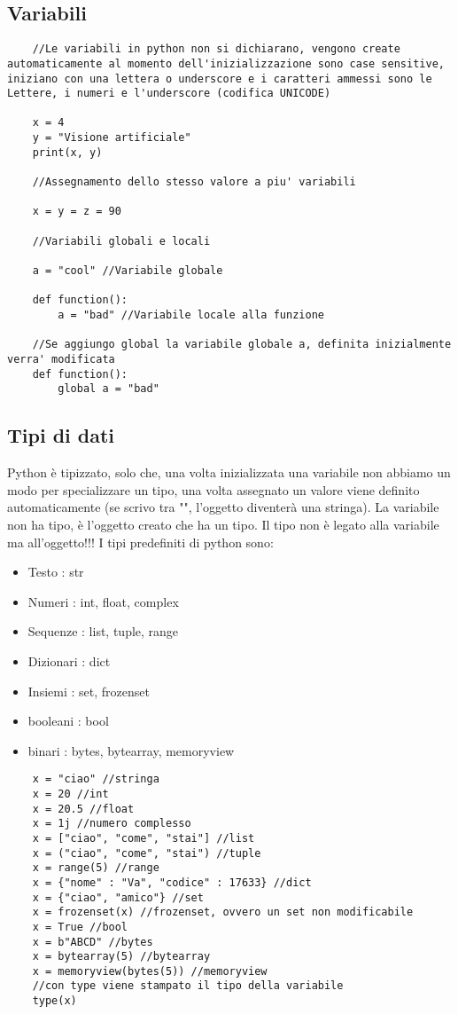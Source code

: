 \subsection{Variabili}

\begin{lstlisting}
	//Le variabili in python non si dichiarano, vengono create automaticamente al momento dell'inizializzazione sono case sensitive, iniziano con una lettera o underscore e i caratteri ammessi sono le Lettere, i numeri e l'underscore (codifica UNICODE)
	
	x = 4
	y = "Visione artificiale"
	print(x, y)
	
	//Assegnamento dello stesso valore a piu' variabili
	
	x = y = z = 90
	
	//Variabili globali e locali
	
	a = "cool" //Variabile globale
	
	def function():
		a = "bad" //Variabile locale alla funzione 
		
	//Se aggiungo global la variabile globale a, definita inizialmente verra' modificata
	def function():
		global a = "bad"
\end{lstlisting}

\subsection{Tipi di dati}

Python è tipizzato, solo che, una volta inizializzata una variabile non abbiamo un modo per specializzare un tipo, una volta assegnato un valore viene definito automaticamente (se scrivo tra "", l'oggetto diventerà una stringa). La variabile non ha tipo, è l'oggetto creato che ha un tipo. Il tipo non è legato alla variabile ma all'oggetto!!! I tipi predefiniti di python sono:
\begin{itemize}
	\item Testo : str
	\item Numeri : int, float, complex
	\item Sequenze : list, tuple, range
	\item Dizionari : dict
	\item Insiemi : set, frozenset
	\item booleani : bool
	\item binari : bytes, bytearray, memoryview
\end{itemize}

\newpage

\begin{lstlisting}
	x = "ciao" //stringa
	x = 20 //int
	x = 20.5 //float
	x = 1j //numero complesso
	x = ["ciao", "come", "stai"] //list
	x = ("ciao", "come", "stai") //tuple
	x = range(5) //range
	x = {"nome" : "Va", "codice" : 17633} //dict
	x = {"ciao", "amico"} //set
	x = frozenset(x) //frozenset, ovvero un set non modificabile
	x = True //bool
	x = b"ABCD" //bytes
	x = bytearray(5) //bytearray
	x = memoryview(bytes(5)) //memoryview
	//con type viene stampato il tipo della variabile
	type(x)
\end{lstlisting}


